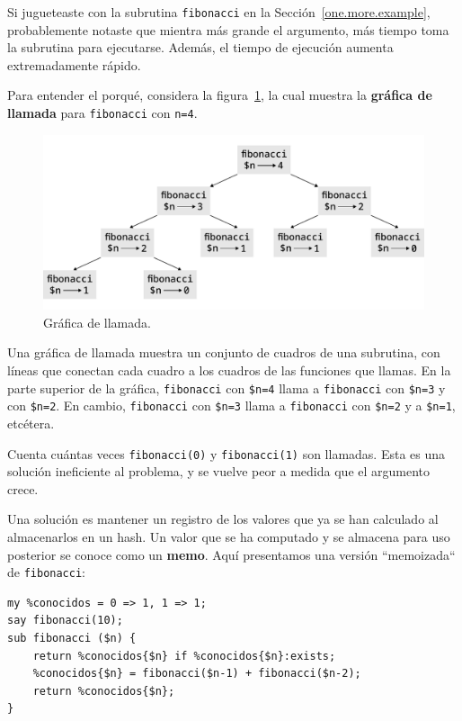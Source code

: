 Si jugueteaste con la subrutina {\tt fibonacci} en la 
Sección~\ref{one.more.example}, probablemente notaste que 
mientra más grande el argumento, más tiempo toma la subrutina
para ejecutarse. Además, el tiempo de ejecución aumenta extremadamente
rápido.

Para entender el porqué, considera la figura~\ref{fig.fibonacci},
la cual muestra la {\bf gráfica de llamada} para {\tt fibonacci} 
con {\tt n=4}.

\begin{figure}
\centerline
{\includegraphics[scale=0.7]{figs/fibonacci.pdf}}
\caption{Gráfica de llamada.}
\label{fig.fibonacci}
\end{figure}

Una gráfica de llamada muestra un conjunto de cuadros de 
una subrutina, con líneas que conectan cada cuadro a los 
cuadros de las funciones que llamas. En la parte superior
de la gráfica, {\tt fibonacci} con \verb|$n=4| llama a \verb|fibonacci|
con \verb|$n=3| y con \verb|$n=2|. En cambio, {\tt fibonacci} con
\verb|$n=3| llama a {\tt fibonacci} con \verb|$n=2| y a \verb|$n=1|,
etcétera.

Cuenta cuántas veces {\tt fibonacci(0)} y {\tt fibonacci(1)} 
son llamadas. Esta es una solución ineficiente al problema,
y se vuelve peor a medida que el argumento crece.

Una solución es mantener un registro de los valores que ya se han
calculado al almacenarlos en un hash. Un valor que se ha computado
y se almacena para uso posterior se conoce como un {\bf memo}. 
Aquí presentamos una versión ``memoizada`` de {\tt fibonacci}:

\begin{lstlisting}
my %conocidos = 0 => 1, 1 => 1;
say fibonacci(10);
sub fibonacci ($n) {
    return %conocidos{$n} if %conocidos{$n}:exists;
    %conocidos{$n} = fibonacci($n-1) + fibonacci($n-2);
    return %conocidos{$n};
}
\end{lstlisting}
%

